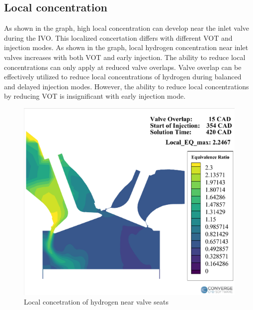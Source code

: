 \documentclass[conference]{IEEEtran}
\begin{document}
\subsection{Local concentration}
As shown in the graph, high local concentration can develop near the inlet valve during the IVO.
This localized concertation differs with different VOT and injection modes.
As shown in the graph, local hydrogen concentration near inlet valves increases with both VOT and early injection.
The ability to reduce local concentrations can only apply at reduced valve overlaps.
Valve overlap can be effectively utilized to reduce local concentrations of hydrogen during balanced and delayed injection modes.
However, the ability to reduce local concentrations by reducing VOT is insignificant with early injection mode. 
    
\begin{figure}[htbp]
    \centerline{\includegraphics{plots and graphs/5.png}}
    \caption{Local concetration of hydrogen near valve seats}
    \label{plt_5}
    \end{figure}
\end{document}
